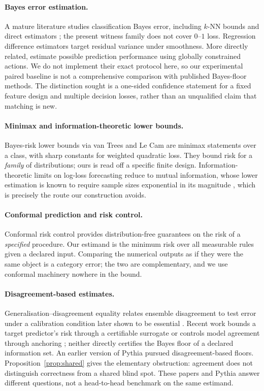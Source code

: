 \documentclass[11pt]{article}
\theoremstyle{definition}
\begin{document}
\paragraph{Bayes error estimation.} A mature literature studies classification Bayes error, including $k$-NN bounds \citep{devroye} and direct estimators \citep{ishida}; the present witness family does not cover $0$--$1$ loss. Regression difference estimators \citep{rice} target residual variance under smoothness. More directly related, \citet{anderson} estimate possible prediction performance using globally constrained actions. We do not implement their exact protocol here, so our experimental paired baseline is not a comprehensive comparison with published Bayes-floor methods. The distinction sought is a one-sided confidence statement for a fixed feature design and multiple decision losses, rather than an unqualified claim that matching is new.

\paragraph{Minimax and information-theoretic lower bounds.} Bayes-risk lower bounds via van Trees and Le Cam \citep{vantrees,chen} are minimax statements over a class, with sharp constants for weighted quadratic loss. They bound risk for a \emph{family} of distributions; ours is read off a specific finite design. Information-theoretic limits on log-loss forecasting reduce to mutual information, whose lower estimation is known to require sample sizes exponential in its magnitude \citep{mcallester}, which is precisely the route our construction avoids.

\paragraph{Conformal prediction and risk control.} Conformal risk control \citep{crc} provides distribution-free guarantees on the risk of a \emph{specified} procedure. Our estimand is the minimum risk over all measurable rules given a declared input. Comparing the numerical outputs as if they were the same object is a category error; the two are complementary, and we use conformal machinery nowhere in the bound.

\paragraph{Disagreement-based estimates.} Generalisation--disagreement equality \citep{jiang} relates ensemble disagreement to test error under a calibration condition later shown to be essential \citep{kirsch}. Recent work bounds a target predictor's risk through a certifiable surrogate \citep{bazinet} or controls model agreement through anchoring \citep{eaton}; neither directly certifies the Bayes floor of a declared information set. An earlier version of Pythia pursued disagreement-based floors. Proposition~\ref{prop:shared} gives the elementary obstruction: agreement does not distinguish correctness from a shared blind spot. These papers and Pythia answer different questions, not a head-to-head benchmark on the same estimand.
\end{document}
